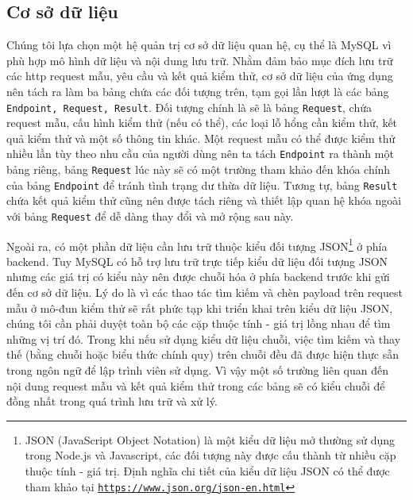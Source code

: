 \subsection{Cơ sở dữ liệu}
Chúng tôi lựa chọn một hệ quản trị cơ sở dữ liệu quan hệ, cụ thể là MySQL vì phù hợp mô hình dữ liệu và nội dung lưu trữ. Nhằm đảm bảo mục đích lưu trữ các \acrshort{http} request mẫu, yêu cầu và kết quả kiểm thử, cơ sở dữ liệu của ứng dụng nên tách ra làm ba bảng chứa các đối tượng trên, tạm gọi lần lượt là các bảng \texttt{Endpoint, Request, Result}. Đối tượng chính là sẽ là bảng \texttt{Request}, chứa request mẫu, cấu hình kiểm thử (nếu có thể), các loại lỗ hổng cần kiểm thử, kết quả kiểm thử và một số thông tin khác. Một request mẫu có thể được kiểm thử nhiều lần tùy theo nhu cầu của người dùng nên ta tách \texttt{Endpoint} ra thành một bảng riêng, bảng \texttt{Request} lúc này sẽ có một trường tham khảo đến khóa chính của bảng \texttt{Endpoint} để tránh tình trạng dư thừa dữ liệu. Tương tự, bảng \texttt{Result} chứa kết quả kiểm thử cũng nên được tách riêng và thiết lập quan hệ khóa ngoài với bảng \texttt{Request} để dễ dàng thay đổi và mở rộng sau này.\par
Ngoài ra, có một phần dữ liệu cần lưu trữ thuộc kiểu đối tượng JSON\footnote{JSON (JavaScript Object Notation) là một kiểu dữ liệu mở thường sử dụng trong Node.js và Javascript, các đối tượng này được cấu thành từ nhiều cặp thuộc tính - giá trị. Định nghĩa chi tiết của kiểu dữ liệu JSON có thể được tham khảo tại \href{https://www.json.org/json-en.html}{\texttt{https://www.json.org/json-en.html}}} ở phía backend. Tuy MySQL có hỗ trợ lưu trữ trực tiếp kiểu dữ liệu đối tượng JSON nhưng các giá trị có kiểu này nên được chuỗi hóa ở phía backend trước khi gửi đến cơ sở dữ liệu. Lý do là vì các thao tác tìm kiếm và chèn payload trên request mẫu ở mô-đun kiểm thử sẽ rất phức tạp khi triển khai trên kiểu dữ liệu JSON, chúng tôi cần phải duyệt toàn bộ các cặp thuộc tính - giá trị lồng nhau để tìm những vị trí đó. Trong khi nếu sử dụng kiểu dữ liệu chuỗi, việc tìm kiếm và thay thế (bằng chuỗi hoặc biểu thức chính quy) trên chuỗi đều đã được hiện thực sẵn trong ngôn ngữ để lập trình viên sử dụng. Vì vậy một số trường liên quan đến nội dung request mẫu và kết quả kiểm thử trong các bảng sẽ có kiểu chuỗi để đồng nhất trong quá trình lưu trữ và xử lý.